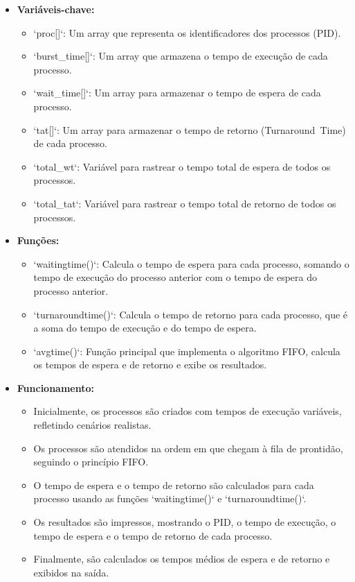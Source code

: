 \documentclass[
	12pt,				%
	openright,			%
	oneside,			%
	a4paper,			%
	chapter=TITLE,		%
	english,			%
	french,				%
	spanish,			%
	brazil				%
	]{abntex2}
\theoremstyle{definition}
\begin{document}
\begin{itemize}
    \item \textbf{Variáveis-chave:}
      \begin{itemize}
        \item `proc[]`: Um array que representa os identificadores dos processos (PID).
        \item `burst\_time[]`: Um array que armazena o tempo de execução de cada processo.
        \item `wait\_time[]`: Um array para armazenar o tempo de espera de cada processo.
        \item `tat[]`: Um array para armazenar o tempo de retorno (Turnaround\ Time) de cada processo.
        \item `total\_wt`: Variável para rastrear o tempo total de espera de todos os processos.
        \item `total\_tat`: Variável para rastrear o tempo total de retorno de todos os processos.
      \end{itemize}
  
    \item \textbf{Funções:}
      \begin{itemize}
        \item `waitingtime()`: Calcula o tempo de espera para cada processo, somando o tempo de execução do processo anterior com o tempo de espera do processo anterior.
        \item `turnaroundtime()`: Calcula o tempo de retorno para cada processo, que é a soma do tempo de execução e do tempo de espera.
        \item `avgtime()`: Função principal que implementa o algoritmo FIFO, calcula os tempos de espera e de retorno e exibe os resultados.
      \end{itemize}
  
    \item \textbf{Funcionamento:}
      \begin{itemize}
        \item Inicialmente, os processos são criados com tempos de execução variáveis, refletindo cenários realistas.
        \item Os processos são atendidos na ordem em que chegam à fila de prontidão, seguindo o princípio FIFO.
        \item O tempo de espera e o tempo de retorno são calculados para cada processo usando as funções `waitingtime()` e `turnaroundtime()`.
        \item Os resultados são impressos, mostrando o PID, o tempo de execução, o tempo de espera e o tempo de retorno de cada processo.
        \item Finalmente, são calculados os tempos médios de espera e de retorno e exibidos na saída.
      \end{itemize}
  \end{itemize}
\end{document}

